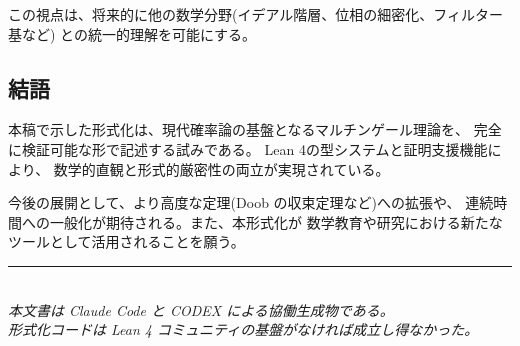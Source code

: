 \documentclass[a4paper,12pt]{ltjsarticle}
\theoremstyle{definition}
\begin{document}
\begin{center}
\end{center}

この視点は、将来的に他の数学分野(イデアル階層、位相の細密化、フィルター基など)
との統一的理解を可能にする。

\subsection{結語}

本稿で示した形式化は、現代確率論の基盤となるマルチンゲール理論を、
完全に検証可能な形で記述する試みである。
Lean 4の型システムと証明支援機能により、
数学的直観と形式的厳密性の両立が実現されている。

今後の展開として、より高度な定理(Doob の収束定理など)への拡張や、
連続時間への一般化が期待される。また、本形式化が
数学教育や研究における新たなツールとして活用されることを願う。

\vspace{1em}
\begin{center}
\rule{0.5\textwidth}{0.4pt}\\[0.5em]
\textit{本文書は Claude Code と CODEX による協働生成物である。}\\
\textit{形式化コードは Lean 4 コミュニティの基盤がなければ成立し得なかった。}
\end{center}
\end{document}
